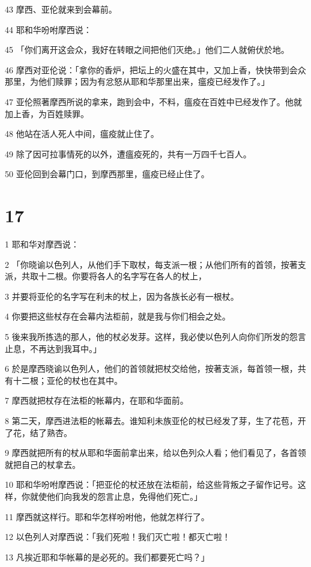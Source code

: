 \par 43 摩西、亚伦就来到会幕前。
\par 44 耶和华吩咐摩西说：
\par 45 「你们离开这会众，我好在转眼之间把他们灭绝。」他们二人就俯伏於地。
\par 46 摩西对亚伦说：「拿你的香炉，把坛上的火盛在其中，又加上香，快快带到会众那里，为他们赎罪；因为有忿怒从耶和华那里出来，瘟疫已经发作了。」
\par 47 亚伦照著摩西所说的拿来，跑到会中，不料，瘟疫在百姓中已经发作了。他就加上香，为百姓赎罪。
\par 48 他站在活人死人中间，瘟疫就止住了。
\par 49 除了因可拉事情死的以外，遭瘟疫死的，共有一万四千七百人。
\par 50 亚伦回到会幕门口，到摩西那里，瘟疫已经止住了。

\chapter{17}

\par 1 耶和华对摩西说：
\par 2 「你晓谕以色列人，从他们手下取杖，每支派一根；从他们所有的首领，按著支派，共取十二根。你要将各人的名字写在各人的杖上，
\par 3 并要将亚伦的名字写在利未的杖上，因为各族长必有一根杖。
\par 4 你要把这些杖存在会幕内法柜前，就是我与你们相会之处。
\par 5 後来我所拣选的那人，他的杖必发芽。这样，我必使以色列人向你们所发的怨言止息，不再达到我耳中。」
\par 6 於是摩西晓谕以色列人，他们的首领就把杖交给他，按著支派，每首领一根，共有十二根；亚伦的杖也在其中。
\par 7 摩西就把杖存在法柜的帐幕内，在耶和华面前。
\par 8 第二天，摩西进法柜的帐幕去。谁知利未族亚伦的杖已经发了芽，生了花苞，开了花，结了熟杏。
\par 9 摩西就把所有的杖从耶和华面前拿出来，给以色列众人看；他们看见了，各首领就把自己的杖拿去。
\par 10 耶和华吩咐摩西说：「把亚伦的杖还放在法柜前，给这些背叛之子留作记号。这样，你就使他们向我发的怨言止息，免得他们死亡。」
\par 11 摩西就这样行。耶和华怎样吩咐他，他就怎样行了。
\par 12 以色列人对摩西说：「我们死啦！我们灭亡啦！都灭亡啦！
\par 13 凡挨近耶和华帐幕的是必死的。我们都要死亡吗？」

